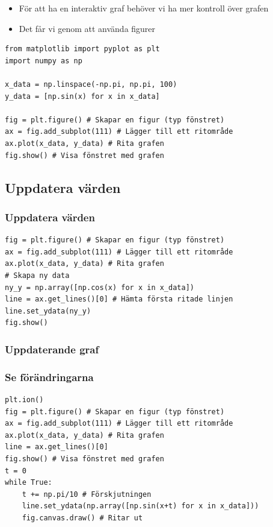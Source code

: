 \documentclass[aspectratio=169]{beamer}
\begin{document}
\begin{frame}[fragile]

	\begin{itemize}
		\item För att ha en interaktiv graf behöver vi ha mer kontroll över grafen
		\item Det får vi genom att använda figurer
	\end{itemize}
	
	\begin{lstlisting}
from matplotlib import pyplot as plt
import numpy as np

x_data = np.linspace(-np.pi, np.pi, 100)
y_data = [np.sin(x) for x in x_data]

fig = plt.figure() # Skapar en figur (typ fönstret)
ax = fig.add_subplot(111) # Lägger till ett ritområde
ax.plot(x_data, y_data) # Rita grafen
fig.show() # Visa fönstret med grafen
	\end{lstlisting}

\end{frame}

\subsection{Uppdatera värden}

\begin{frame}[fragile]
	\frametitle{Uppdatera värden}
	
	\begin{lstlisting}
fig = plt.figure() # Skapar en figur (typ fönstret)
ax = fig.add_subplot(111) # Lägger till ett ritområde
ax.plot(x_data, y_data) # Rita grafen
# Skapa ny data
ny_y = np.array([np.cos(x) for x in x_data])
line = ax.get_lines()[0] # Hämta första ritade linjen
line.set_ydata(ny_y)
fig.show()
	\end{lstlisting}
	
\end{frame}

\begin{frame}
	\frametitle{Uppdaterande graf}
	
	\centering
	
\end{frame}

\begin{frame}[fragile]
	\frametitle{Se förändringarna}
	
	\begin{lstlisting}
plt.ion()
fig = plt.figure() # Skapar en figur (typ fönstret)
ax = fig.add_subplot(111) # Lägger till ett ritområde
ax.plot(x_data, y_data) # Rita grafen
line = ax.get_lines()[0]
fig.show() # Visa fönstret med grafen
t = 0
while True:
    t += np.pi/10 # Förskjutningen
    line.set_ydata(np.array([np.sin(x+t) for x in x_data]))
    fig.canvas.draw() # Ritar ut
	\end{lstlisting}
	
\end{frame}
\end{document}
